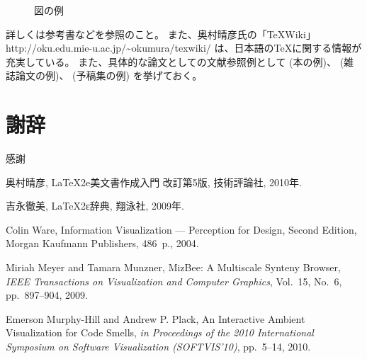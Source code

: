 \documentclass[a4paper,11pt]{jreport}
\begin{document}
\begin{figure}[htbp]
\begin{center}
\end{center}
\caption{図の例}
\label{figure:sample}
\end{figure}

詳しくは参考書\cite{okumura2010,yoshinaga2009}などを参照のこと。
また、奥村晴彦氏の「\TeX Wiki」
http://oku.edu.mie-u.ac.jp/\textasciitilde{}okumura/texwiki/
は、日本語の\TeX に関する情報が充実している。
また、具体的な論文としての文献参照例として
(本の例)\cite{ware2004}、
(雑誌論文の例)\cite{meyer2009}、
(予稿集の例)\cite{hill2010}
を挙げておく。

\chapter*{謝辞}

感謝

\newpage


\renewcommand{\bibname}{参考文献}

%
%

\begin{thebibliography}{1}
奥村晴彦, LaTeX2e美文書作成入門 改訂第5版, 技術評論社, 2010年.

吉永徹美, LaTeX2ε辞典, 翔泳社, 2009年.

Colin Ware, Information Visualization --- Perception for Design, Second Edition, Morgan Kaufmann Publishers, 486~p., 2004.

Miriah Meyer and Tamara Munzner, MizBee: A Multiscale Synteny Browser, {\em IEEE Transactions on Visualization and Computer Graphics}, Vol.~15, No.~6, pp.~897--904, 2009.

Emerson Murphy-Hill and Andrew P. Plack, An Interactive Ambient Visualization for Code Smells, {\em in Proceedings of the 2010 International Symposium on Software Visualization (SOFTVIS’10)}, pp.~5--14, 2010.

\end{thebibliography}
\end{document}

